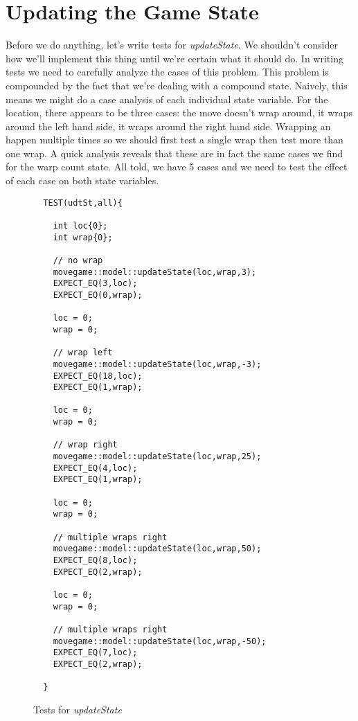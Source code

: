 \documentclass[nobib]{tufte-handout}
\begin{document}
\section{Updating the Game State}

Before we do anything, let's write tests for \textit{updateState}. We shouldn't consider how we'll implement this thing until we're certain what it should do. In writing tests we need to carefully analyze the cases of this problem. This problem is compounded by the fact that we're dealing with a compound state. Naively, this means we might do a case analysis of each individual state variable. For the location, there appears to be three cases: the move doesn't wrap around, it wraps around the left hand side, it wraps around the right hand side. Wrapping an happen multiple times so we should first test a single wrap then test more than one wrap. A quick analysis reveals that these are in fact the same cases we find for the warp count state. All told, we have 5 cases and we need to test the effect of each case on both state variables.

\begin{figure}[!htbp]
\begin{lstlisting}
  TEST(udtSt,all){

    int loc{0};
    int wrap{0};
	
	// no wrap
    movegame::model::updateState(loc,wrap,3);
    EXPECT_EQ(3,loc);
    EXPECT_EQ(0,wrap);

    loc = 0;
    wrap = 0;

	// wrap left
    movegame::model::updateState(loc,wrap,-3);
    EXPECT_EQ(18,loc);
    EXPECT_EQ(1,wrap);

    loc = 0;
    wrap = 0;

	// wrap right
    movegame::model::updateState(loc,wrap,25);
    EXPECT_EQ(4,loc);
    EXPECT_EQ(1,wrap);

    loc = 0;
    wrap = 0;

	// multiple wraps right
    movegame::model::updateState(loc,wrap,50);
    EXPECT_EQ(8,loc);
    EXPECT_EQ(2,wrap);    
    
    loc = 0;
    wrap = 0;

   	// multiple wraps right
    movegame::model::updateState(loc,wrap,-50);
    EXPECT_EQ(7,loc);
    EXPECT_EQ(2,wrap);    
    
  }
\end{lstlisting}
\caption{Tests for \textit{updateState}}
\label{fig:update-tests}
\end{figure}
\end{document}
